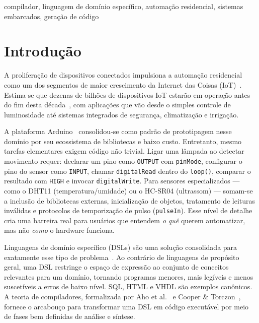 \documentclass[conference]{IEEEtran}
\begin{document}
\begin{IEEEkeywords}
compilador, linguagem de domínio específico, automação residencial, sistemas
embarcados, geração de código
\end{IEEEkeywords}

\section{Introdução}
\label{sec:intro}

A proliferação de dispositivos conectados impulsiona a automação residencial
como um dos segmentos de maior crescimento da Internet das Coisas
(IoT)~\cite{atzori2010,alfuqaha2015}. Estima-se que dezenas de bilhões de
dispositivos IoT estarão em operação antes do fim desta
década~\cite{zanella2014}, com aplicações que vão desde o simples controle de
luminosidade até sistemas integrados de segurança, climatização e irrigação.

A plataforma Arduino~\cite{banzi2011} consolidou-se como padrão de
prototipagem nesse domínio por seu ecossistema de bibliotecas e baixo custo.
Entretanto, mesmo tarefas elementares exigem código não trivial. Ligar uma
lâmpada ao detectar movimento requer: declarar um pino como \texttt{OUTPUT}
com \texttt{pinMode}, configurar o pino do sensor como \texttt{INPUT},
chamar \texttt{digitalRead} dentro do \texttt{loop()}, comparar o resultado
com \texttt{HIGH} e invocar \texttt{digitalWrite}. Para sensores
especializados — como o DHT11 (temperatura/umidade) ou o HC-SR04
(ultrassom) — somam-se a inclusão de bibliotecas externas, inicialização de
objetos, tratamento de leituras inválidas e protocolos de temporização de
pulso (\texttt{pulseIn}). Esse nível de detalhe cria uma barreira real para
usuários que entendem \emph{o quê} querem automatizar, mas não
\emph{como} o hardware funciona.

Linguagens de domínio específico (DSLs) são uma solução consolidada para
exatamente esse tipo de problema~\cite{mernik2005,fowler2010,vandeursen2000}.
Ao contrário de linguagens de propósito geral, uma DSL restringe o espaço de
expressão ao conjunto de conceitos relevantes para um domínio, tornando
programas menores, mais legíveis e menos suscetíveis a erros de baixo nível.
SQL, HTML e VHDL são exemplos canônicos. A teoria de compiladores, formalizada
por Aho et al.~\cite{aho2006} e Cooper \& Torczon~\cite{cooper2011}, fornece
o arcabouço para transformar uma DSL em código executável por meio de fases
bem definidas de análise e síntese.
\end{document}
